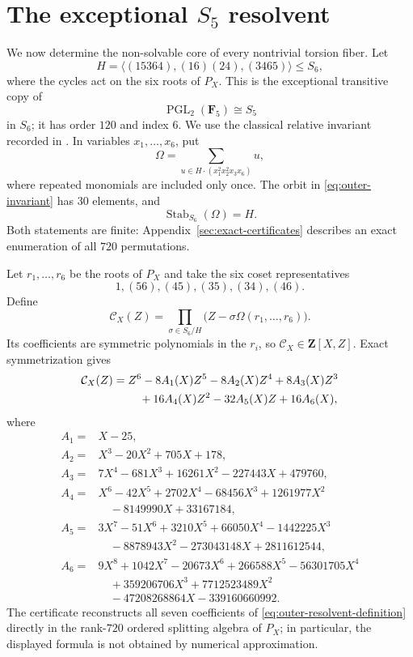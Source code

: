 \section{The exceptional \texorpdfstring{$S_5$}{S5} resolvent}
\label{sec:outer-s5-resolvent}

We now determine the non-solvable core of every nontrivial torsion
fiber.  Let
\[
 H=\langle(15364),(16)(24),(3465)\rangle\leq S_6,
\]
where the cycles act on the six roots of $P_X$.  This is the exceptional
transitive copy of
\[
 \operatorname{PGL}_2(\mathbf F_5)\cong S_5
\]
in $S_6$; it has order $120$ and index $6$.  We use the classical
relative invariant recorded in
\cite[Table~4]{AwtreyFrenchJakesRussell2015}.  In variables
$x_1,\ldots,x_6$, put
\begin{equation}
 \Omega=\sum_{u\in H\cdot(x_1^2x_2^2x_3x_6)}u,
 \label{eq:outer-invariant}
\end{equation}
where repeated monomials are included only once.  The orbit in
\eqref{eq:outer-invariant} has $30$ elements, and
\[
 \operatorname{Stab}_{S_6}(\Omega)=H.
\]
Both statements are finite: Appendix~\ref{sec:exact-certificates}
describes an exact enumeration of all $720$ permutations.

Let $r_1,\ldots,r_6$ be the roots of $P_X$ and take the six coset
representatives
\[
 1,(56),(45),(35),(34),(46).
\]
Define
\begin{equation}
 \mathcal C_X(Z)=
 \prod_{\sigma\in S_6/H}
 \bigl(Z-\sigma\Omega(r_1,\ldots,r_6)\bigr).
 \label{eq:outer-resolvent-definition}
\end{equation}
Its coefficients are symmetric polynomials in the $r_i$, so
$\mathcal C_X\in\mathbf Z[X,Z]$.  Exact symmetrization gives
\begin{align}
 \mathcal C_X(Z)={}&Z^6-8A_1(X)Z^5-8A_2(X)Z^4+8A_3(X)Z^3\notag\\
 &\quad+16A_4(X)Z^2-32A_5(X)Z+16A_6(X),
 \label{eq:outer-resolvent}
\end{align}
where
\begin{align*}
 A_1={}&X-25,\\
 A_2={}&X^3-20X^2+705X+178,\\
 A_3={}&7X^4-681X^3+16261X^2-227443X+479760,\\
 A_4={}&X^6-42X^5+2702X^4-68456X^3+1261977X^2\\
       &\quad-8149990X+33167184,\\
 A_5={}&3X^7-51X^6+3210X^5+66050X^4-1442225X^3\\
       &\quad-8878943X^2-273043148X+2811612544,\\
 A_6={}&9X^8+1042X^7-20673X^6+266588X^5-56301705X^4\\
       &\quad+359206706X^3+7712523489X^2\\
       &\quad-47208268864X-339160660992.
\end{align*}
The certificate reconstructs all seven coefficients of
\eqref{eq:outer-resolvent-definition} directly in the rank-$720$
ordered splitting algebra of $P_X$; in particular, the displayed
formula is not obtained by numerical approximation.

